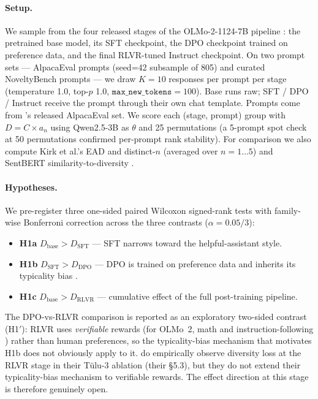 \paragraph{Setup.} We sample from the four released stages of the OLMo-2-1124-7B pipeline \citep{olmo2024olmo2}: the pretrained base model, its SFT checkpoint, the DPO checkpoint trained on preference data, and the final RLVR-tuned Instruct checkpoint. On two prompt sets --- \olmoAlpacaN{} AlpacaEval prompts (seed=42 subsample of 805) and \olmoNbCuratedN{} curated NoveltyBench prompts \citep{zhang2025noveltybench} --- we draw $K{=}10$ responses per prompt per stage (temperature 1.0, top-$p$ 1.0, $\texttt{max\_new\_tokens}{=}100$). Base runs raw; SFT / DPO / Instruct receive the prompt through their own chat template. Prompts come from \citet{dubois2024alpacafarm}'s released AlpacaEval set. We score each (stage, prompt) group with $D = C \times a_n$ using Qwen2.5-3B as $\theta$ and 25 permutations (a 5-prompt spot check at 50 permutations confirmed per-prompt rank stability). For comparison we also compute Kirk et al.'s EAD and distinct-$n$ (averaged over $n{=}1\ldots5$) and SentBERT similarity-to-diversity \citep{reimers2019sbert}.

\paragraph{Hypotheses.} We pre-register three one-sided paired Wilcoxon signed-rank tests \citep{dror2018hitchhiker} with family-wise Bonferroni correction across the three contrasts \citep{dror2017replicability} ($\alpha = 0.05/3$):

\begin{itemize}[nosep]
    \item \textbf{H1a} $D_{\mathrm{base}} > D_{\mathrm{SFT}}$ --- SFT narrows toward the helpful-assistant style.
    \item \textbf{H1b} $D_{\mathrm{SFT}} > D_{\mathrm{DPO}}$ --- DPO is trained on preference data and inherits its typicality bias \citep{zhang2025verbalizedsampling}.
    \item \textbf{H1c} $D_{\mathrm{base}} > D_{\mathrm{RLVR}}$ --- cumulative effect of the full post-training pipeline.
\end{itemize}

The DPO-vs-RLVR comparison is reported as an exploratory two-sided contrast (H1$'$): RLVR uses \emph{verifiable} rewards (for OLMo~2, math and instruction-following \citep{olmo2024olmo2}) rather than human preferences, so the typicality-bias mechanism that motivates H1b does not obviously apply to it. \citet{zhang2025verbalizedsampling} do empirically observe diversity loss at the RLVR stage in their T\"ulu-3 ablation (their \S5.3), but they do not extend their typicality-bias mechanism to verifiable rewards. The effect direction at this stage is therefore genuinely open.

